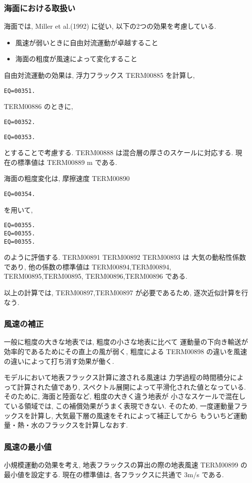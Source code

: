 \subsubsection{海面における取扱い}

海面では, Miller et al.(1992) に従い, 以下の2つの効果を考慮している.
\begin{itemize}
\item 風速が弱いときに自由対流運動が卓越すること
\item 海面の粗度が風速によって変化すること
\end{itemize}

自由対流運動の効果は, 浮力フラックス TERM00885 を計算し,
\begin{verbatim}
EQ=00351.
\end{verbatim}
TERM00886 のときに,
\begin{verbatim}
EQ=00352.
\end{verbatim}
\begin{verbatim}
EQ=00353.
\end{verbatim}
とすることで考慮する.  TERM00888 は混合層の厚さのスケールに対応する.
現在の標準値は TERM00889 m である.

海面の粗度変化は, 摩擦速度 TERM00890
\begin{verbatim}
EQ=00354.
\end{verbatim}
を用いて,
\begin{verbatim}
EQ=00355.
EQ=00355.
EQ=00355.
\end{verbatim}
のように評価する. TERM00891 TERM00892 TERM00893 は
大気の動粘性係数であり, 
他の係数の標準値は
TERM00894,TERM00894,
TERM00895,TERM00895,
TERM00896,TERM00896 である.

以上の計算では, TERM00897,TERM00897 が必要であるため,
逐次近似計算を行なう.

\subsubsection{風速の補正}

一般に粗度の大きな地表では, 粗度の小さな地表に比べて
運動量の下向き輸送が効率的であるためにその直上の風が弱く,
粗度による TERM00898 の違いを風速の違いによって打ち消す効果が働く.

モデルにおいて地表フラックス計算に渡される風速は
力学過程の時間積分によって計算された値であり,
スペクトル展開によって平滑化された値となっている.
そのために, 海面と陸面など, 粗度の大きく違う地表が
小さなスケールで混在している領域では, 
この補償効果がうまく表現できない.
そのため, 一度運動量フラックスを計算し,
大気最下層の風速をそれによって補正してから
もういちど運動量・熱・水のフラックスを計算しなおす.

\subsubsection{風速の最小値}

小規模運動の効果を考え,
地表フラックスの算出の際の地表風速
TERM00899 の最小値を設定する.
現在の標準値は, 各フラックスに共通で
3m/s である.

